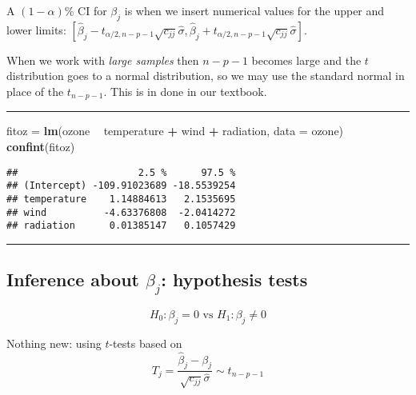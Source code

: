 \documentclass[]{article}
\newenvironment{Shaded}{\begin{snugshade}}{\end{snugshade}}
\newcommand{\DataTypeTok}[1]{\textcolor[rgb]{0.13,0.29,0.53}{#1}}
\newcommand{\KeywordTok}[1]{\textcolor[rgb]{0.13,0.29,0.53}{\textbf{#1}}}
\newcommand{\NormalTok}[1]{#1}
\newcommand{\OperatorTok}[1]{\textcolor[rgb]{0.81,0.36,0.00}{\textbf{#1}}}
\newcommand{\StringTok}[1]{\textcolor[rgb]{0.31,0.60,0.02}{#1}}
\begin{document}
A \((1-\alpha)\)\% CI for \(\beta_j\) is when we insert numerical values
for the upper and lower limits:
\([\hat{\beta}_j-t_{\alpha/2,n-p-1}\sqrt{c_{jj}}\hat{\sigma},\hat{\beta}_j+t_{\alpha/2,n-p-1}\sqrt{c_{jj}}\hat{\sigma}]\).

When we work with \emph{large samples} then \(n-p-1\) becomes large and
the \(t\) distribution goes to a normal distribution, so we may use the
standard normal in place of the \(t_{n-p-1}\). This is in done in our
textbook.

\begin{center}\rule{0.5\linewidth}{\linethickness}\end{center}

\footnotesize

\begin{Shaded}
\begin{Highlighting}[]
\NormalTok{fitoz =}\StringTok{ }\KeywordTok{lm}\NormalTok{(ozone }\OperatorTok{~}\StringTok{ }\NormalTok{temperature }\OperatorTok{+}\StringTok{ }\NormalTok{wind }\OperatorTok{+}\StringTok{ }\NormalTok{radiation, }\DataTypeTok{data =}\NormalTok{ ozone)}
\KeywordTok{confint}\NormalTok{(fitoz)}
\end{Highlighting}
\end{Shaded}

\begin{verbatim}
##                     2.5 %      97.5 %
## (Intercept) -109.91023689 -18.5539254
## temperature    1.14884613   2.1535695
## wind          -4.63376808  -2.0414272
## radiation      0.01385147   0.1057429
\end{verbatim}

\normalsize

\begin{center}\rule{0.5\linewidth}{\linethickness}\end{center}

\hypertarget{inference-about-beta_j-hypothesis-tests}{%
\subsection{\texorpdfstring{Inference about \(\beta_j\): hypothesis
tests}{Inference about \textbackslash{}beta\_j: hypothesis tests}}\label{inference-about-beta_j-hypothesis-tests}}

\[H_0: \beta_j=0 \text{ vs } H_1: \beta_j\neq 0\]

Nothing new: using \(t\)-tests based on
\[ T_j=\frac{\hat{\beta}_j-\beta_j}{\sqrt{c_{jj}}\hat{\sigma}}\sim t_{n-p-1}\]
\end{document}
